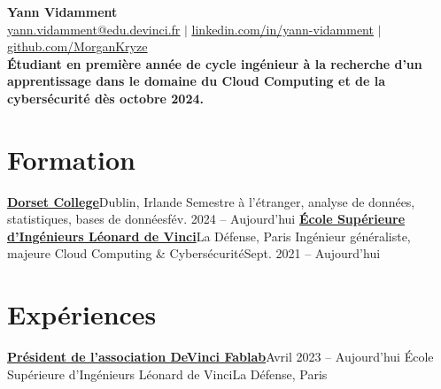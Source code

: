\documentclass[letterpaper,11pt]{article}
\begin{document}
\begin{center}
  \textbf{\Huge Yann Vidamment} \\ \vspace{1pt}
  \href{mailto:yann.vidamment@edu.devinci.fr}{\underline{yann.vidamment@edu.devinci.fr}} $|$ 
  \href{https://linkedin.com/in/yann-vidamment-80a512254/}{\underline{linkedin.com/in/yann-vidamment}} $|$
  \href{https://github.com/MorganKryze}{\underline{github.com/MorganKryze}} \\
  \vspace{6pt}
  \textbf{\small{Étudiant en première année de cycle ingénieur à la recherche d'un apprentissage dans le domaine du Cloud Computing et de la cybersécurité dès octobre 2024.}}
\end{center}

\section{Formation}
  \resumeSubHeadingListStart
    \resumeSubheading
      {\href{https://dorset.ie/}{\textbf{Dorset College}}}{Dublin, Irlande}
      {Semestre à l'étranger, analyse de données, statistiques, bases de données}{fév. 2024 -- Aujourd'hui}
    \resumeSubheading
      {\href{https://www.esilv.fr/}{\textbf{École Supérieure d'Ingénieurs Léonard de Vinci}}}{La Défense, Paris}
      {Ingénieur généraliste, majeure Cloud Computing \& Cybersécurité}{Sept. 2021 -- Aujourd'hui}
  \resumeSubHeadingListEnd

\section{Expériences}
  \resumeSubHeadingListStart
    \resumeSubheading
      {\href{https://dvic.devinci.fr/fablab/}{\textbf{Président de l'association DeVinci Fablab}}}{Avril 2023 -- Aujourd'hui}
      {École Supérieure d'Ingénieurs Léonard de Vinci}{La Défense, Paris}
      \resumeItemListStart
      \resumeItemListEnd
\end{document}
